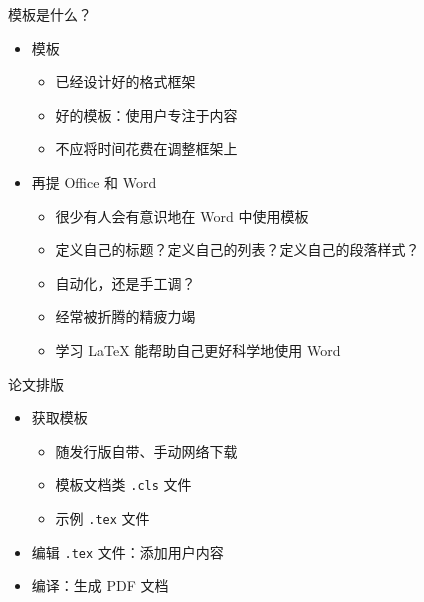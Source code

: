     
\begin{frame}{模板是什么？}
  \begin{itemize}
    \item 模板
      \begin{itemize}
        \item 已经设计好的格式框架
        \item 好的模板：使用户专注于内容
        \item 不应将时间花费在调整框架上
      \end{itemize}
    \item 再提 Office 和 Word
      \begin{itemize}
        \item 很少有人会有意识地在 Word 中使用模板
        \item 定义自己的标题？定义自己的列表？定义自己的段落样式？
        \item 自动化，还是手工调？
        \item 经常被折腾的精疲力竭
        \item 学习 \LaTeX{} 能帮助自己更好科学地使用 Word
      \end{itemize}
  \end{itemize}
\end{frame}

\begin{frame}{论文排版}
  \begin{itemize}
    \item 获取模板
      \begin{itemize}
        \item 随发行版自带、手动网络下载
        \item 模板文档类 \texttt{.cls} 文件
        \item 示例 \texttt{.tex} 文件
      \end{itemize}
    \item 编辑 \texttt{.tex} 文件：添加用户内容
    \item 编译：生成 PDF 文档
  \end{itemize}
\end{frame}

